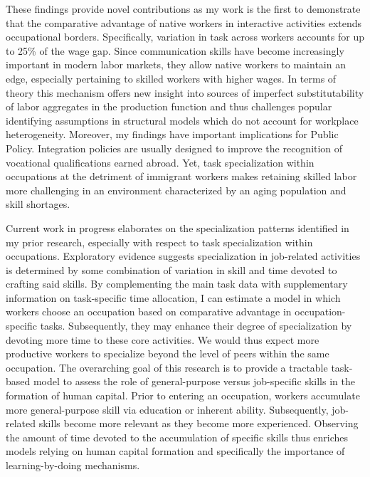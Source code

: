 \documentclass[a4paper,11pt]{article}
\begin{document}
These findings provide novel contributions as my work is the first to demonstrate that the comparative advantage of native workers in interactive activities extends occupational borders. Specifically, variation in task across workers accounts for up to 25\% of the wage gap. Since communication skills have become increasingly important in modern labor markets, they allow native workers to maintain an edge, especially pertaining to skilled workers with higher wages. In terms of theory this mechanism offers new insight into sources of imperfect substitutability of labor aggregates in the production function and thus challenges popular identifying assumptions in structural models which do not account for workplace heterogeneity. Moreover, my findings have important implications for Public Policy. Integration policies are usually designed to improve the recognition of vocational qualifications earned abroad. Yet, task specialization within occupations at the detriment of immigrant workers makes retaining skilled labor more challenging in an environment characterized by an aging population and skill shortages.  %

Current work in progress elaborates on the specialization patterns identified in my prior research, especially with respect to task specialization within occupations. Exploratory evidence suggests specialization in job-related activities is determined by some combination of variation in skill and time devoted to crafting said skills. By complementing the main task data with supplementary information on task-specific time allocation, I can estimate a model in which workers choose an occupation based on comparative advantage in occupation-specific tasks. Subsequently, they may enhance their degree of specialization by devoting more time to these core activities. We would thus expect more productive workers to specialize beyond the level of peers within the same occupation. 
The overarching goal of this research is to provide a tractable task-based model to assess the role of general-purpose versus job-specific skills in the formation of human capital. Prior to entering an occupation, workers accumulate more general-purpose skill via education or inherent ability. Subsequently, job-related skills become more relevant as they become more experienced. Observing the amount of time devoted to the accumulation of specific skills thus enriches models relying on human capital formation and specifically the importance of learning-by-doing mechanisms. 
\end{document}
